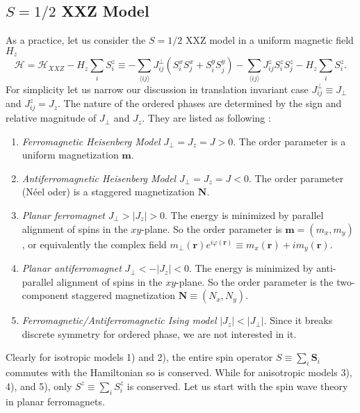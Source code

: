 \documentclass[10pt,nofootinbib]{revtex4}
\def\H{\mathcal{H}}
\begin{document}
	\subsection{$S=1/2$ XXZ Model}
		As a practice, let us consider the $S=1/2$ XXZ model in a uniform magnetic field $H_z$
		\begin{equation}\label{1.1.1}
			\H=\H_{XXZ}-H_z\sum_i S_i^z\equiv-\sum_{\langle ij\rangle}J_{ij}^\perp(S_i^xS_j^x+S_i^yS_j^y)-\sum_{\langle ij\rangle}J_{ij}^zS_i^zS_j^z-H_z\sum_i S_i^z.
		\end{equation}
		For simplicity let us narrow our discussion in translation invariant case $J_{ij}^\perp\equiv J_\perp$ and $J_{ij}^z=J_z$. The nature of the ordered phases are determined by the sign and relative magnitude of $J_\perp$ and $J_z$. They are listed as following \cite{chaikin2000principles}:
		\begin{enumerate}[label=\arabic*)]
			\item \emph{Ferromagnetic Heisenberg Model} $J_\perp=J_z=J>0$. The order parameter is a uniform magnetization $\bm{m}$.
			\item \emph{Antiferromagnetic Heisenberg Model} $J_\perp=J_z=J<0$. The order parameter (N\'{e}el oder) is a staggered magnetization $\bm{N}$.
			\item \emph{Planar ferromagnet} $J_\perp>|J_z|>0$. The energy is minimized by parallel alignment of spins in the $xy$-plane. So the order parameter is $\bm{m}=(m_x,m_y)$, or equivalently the complex field $m_\perp(\bm{r})e^{i\varphi(\bm{r})}\equiv m_x(\bm{r})+im_y(\bm{r})$.
			\item \emph{Planar antiferromagnet} $J_\perp<-|J_z|<0$. The energy is minimized by anti-parallel alignment of spins in the $xy$-plane. So the order parameter is the two-component staggered magnetization $\bm{N}\equiv(N_x,N_y)$.
			\item \emph{Ferromagnetic/Antiferromagnetic Ising model} $|J_z|<|J_\perp|$. Since it breaks discrete symmetry for ordered phase, we are not interested in it.
		\end{enumerate}
		Clearly for isotropic models 1) and 2), the entire spin operator $S\equiv\sum_i\bm{S}_i$ commutes with the Hamiltonian so is conserved. While for anisotropic models 3), 4), and 5), only $S^z\equiv\sum_i S_i^z$ is conserved. Let us start with the spin wave theory in planar ferromagnets.
\end{document}

